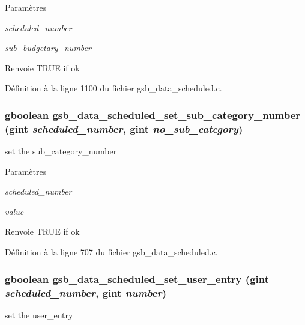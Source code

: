 \begin{DoxyParams}{Paramètres}
\item[{\em scheduled\_\-number}]\item[{\em sub\_\-budgetary\_\-number}]\end{DoxyParams}
\begin{DoxyReturn}{Renvoie}
TRUE if ok 
\end{DoxyReturn}


Définition à la ligne 1100 du fichier gsb\_\-data\_\-scheduled.c.

\subsubsection[{gsb\_\-data\_\-scheduled\_\-set\_\-sub\_\-category\_\-number}]{\setlength{\rightskip}{0pt plus 5cm}gboolean gsb\_\-data\_\-scheduled\_\-set\_\-sub\_\-category\_\-number (gint {\em scheduled\_\-number}, \/  gint {\em no\_\-sub\_\-category})}\label{gsb__data__scheduled_8c_ae7231fb0de3b9b5c8a4f5dfebedfac75}
set the sub\_\-category\_\-number


\begin{DoxyParams}{Paramètres}
\item[{\em scheduled\_\-number}]\item[{\em value}]\end{DoxyParams}
\begin{DoxyReturn}{Renvoie}
TRUE if ok 
\end{DoxyReturn}


Définition à la ligne 707 du fichier gsb\_\-data\_\-scheduled.c.

\subsubsection[{gsb\_\-data\_\-scheduled\_\-set\_\-user\_\-entry}]{\setlength{\rightskip}{0pt plus 5cm}gboolean gsb\_\-data\_\-scheduled\_\-set\_\-user\_\-entry (gint {\em scheduled\_\-number}, \/  gint {\em number})}\label{gsb__data__scheduled_8c_a8fa7fd7b99c2920be933c0865c8b4eb5}
set the user\_\-entry


